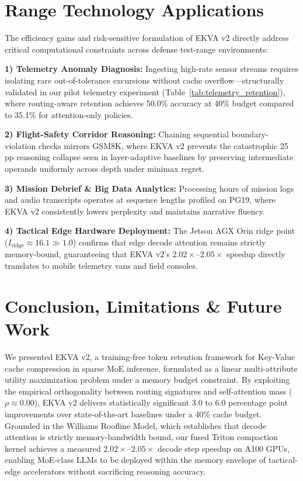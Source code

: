 \documentclass[conference]{IEEEtran}
\begin{document}
\section{Range Technology Applications}
The efficiency gains and risk-sensitive formulation of EKVA v2 directly address critical computational constraints across defense test-range environments:

\textbf{1) Telemetry Anomaly Diagnosis:} Ingesting high-rate sensor streams requires isolating rare out-of-tolerance excursions without cache overflow---structurally validated in our pilot telemetry experiment (Table~\ref{tab:telemetry_retention}), where routing-aware retention achieves 50.0\% accuracy at 40\% budget compared to 35.1\% for attention-only policies.

\textbf{2) Flight-Safety Corridor Reasoning:} Chaining sequential boundary-violation checks mirrors GSM8K, where EKVA v2 prevents the catastrophic 25 pp reasoning collapse seen in layer-adaptive baselines by preserving intermediate operands uniformly across depth under minimax regret.

\textbf{3) Mission Debrief \& Big Data Analytics:} Processing hours of mission logs and audio transcripts operates at sequence lengths profiled on PG19, where EKVA v2 consistently lowers perplexity and maintains narrative fluency.

\textbf{4) Tactical Edge Hardware Deployment:} The Jetson AGX Orin ridge point ($I_{\text{ridge}} \approx 16.1 \gg 1.0$) confirms that edge decode attention remains strictly memory-bound, guaranteeing that EKVA v2's $2.02\times$--$2.05\times$ speedup directly translates to mobile telemetry vans and field consoles.

\section{Conclusion, Limitations \& Future Work}
We presented EKVA v2, a training-free token retention framework for Key-Value cache compression in sparse MoE inference, formulated as a linear multi-attribute utility maximization problem under a memory budget constraint. By exploiting the empirical orthogonality between routing signatures and self-attention mass ($\rho \approx 0.00$), EKVA v2 delivers statistically significant 3.0 to 6.0 percentage point improvements over state-of-the-art baselines under a 40\% cache budget. Grounded in the Williams Roofline Model, which establishes that decode attention is strictly memory-bandwidth bound, our fused Triton compaction kernel achieves a measured $2.02\times$--$2.05\times$ decode step speedup on A100 GPUs, enabling MoE-class LLMs to be deployed within the memory envelope of tactical-edge accelerators without sacrificing reasoning accuracy.
\end{document}
